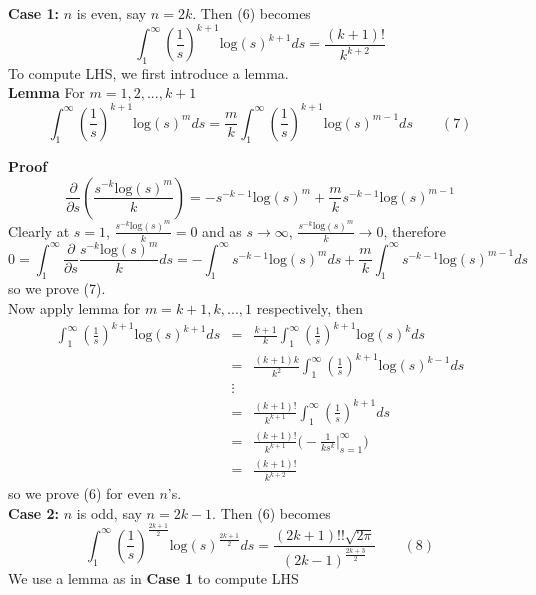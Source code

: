 \documentclass[a4paper,10pt]{article}
\begin{document}
\textbf{Case 1:} $n$ is even, say $n=2k$. Then (6) becomes
$$\int_{1}^{\infty}(\frac{1}{s})^{k+1}\text{log}(s)^{k+1}ds=\frac{(k+1)!}{k^{k+2}}$$ To compute LHS, we first introduce a lemma. \\

\textbf{Lemma } For $m=1,2,...,k+1$ $$\int_{1}^{\infty}(\frac{1}{s})^{k+1}\text{log}(s)^{m}ds=\frac{m}{k}\int_{1}^{\infty}(\frac{1}{s})^{k+1}\text{log}(s)^{m-1}ds\qquad(7)$$

\textbf{Proof } $$\frac{\partial}{\partial s}(\frac{s^{-k}\text{log}(s)^m}{k})=-s^{-k-1}\text{log}(s)^{m}+\frac{m}{k}s^{-k-1}\text{log}(s)^{m-1}$$ Clearly at $s=1$, $\frac{s^{-k}\text{log}(s)^m}{k}=0$ and as  $s\rightarrow\infty$, $\frac{s^{-k}\text{log}(s)^m}{k}\rightarrow0$, therefore $$0=\int_{1}^{\infty}\frac{\partial}{\partial s}\frac{s^{-k}\text{log}(s)^m}{k}ds=-\int_{1}^{\infty}s^{-k-1}\text{log}(s)^{m}ds+\frac{m}{k}\int_{1}^{\infty}s^{-k-1}\text{log}(s)^{m-1}ds$$ so we prove (7). \\ 

Now apply lemma for $m=k+1,k,...,1$ respectively, then 
\begin{eqnarray*}
\int_{1}^{\infty}(\frac{1}{s})^{k+1}\text{log}(s)^{k+1}ds&=&\frac{k+1}{k}\int_{1}^{\infty}(\frac{1}{s})^{k+1}\text{log}(s)^{k}ds\\
&=&\frac{(k+1)k}{k^2}\int_{1}^{\infty}(\frac{1}{s})^{k+1}\text{log}(s)^{k-1}ds\\
&\vdots& \\
&=&\frac{(k+1)!}{k^{k+1}}\int_{1}^{\infty}(\frac{1}{s})^{k+1}ds\\
&=&\frac{(k+1)!}{k^{k+1}}\big(-\frac{1}{ks^k}\bigg|^{\infty}_{s=1}\big)\\
&=&\frac{(k+1)!}{k^{k+2}}
\end{eqnarray*}
so we prove (6) for even $n$'s. \\

\textbf{Case 2:} $n$ is odd, say $n=2k-1$. Then (6) becomes
$$\int_{1}^{\infty}(\frac{1}{s})^{\frac{2k+1}{2}}\text{log}(s)^{\frac{2k+1}{2}}ds=\frac{(2k+1)!!\sqrt{2\pi}}{(2k-1)^{\frac{2k+3}{2}}}\qquad(8)$$ We use a lemma as in \textbf{Case 1} to compute LHS\\
\end{document}
